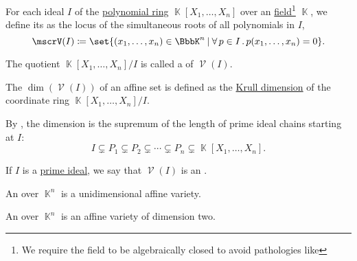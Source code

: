 \begin{definition}\label{def:affine_algebraic_set}
  For each ideal \( I \) of the \hyperref[def:polynomial_algebra]{polynomial ring} \( \BbbK[X_1, \ldots, X_n] \) over an  \hyperref[def:field]{field}\footnote{We require the field to be algebraically closed to avoid pathologies like } \( \BbbK \), we define its  as the locus of the simultaneous roots of all polynomials in \( I \),
  \begin{equation*}
    \mscrV(I) \coloneqq \set{ (x_1, \ldots, x_n) \in \BbbK^n \given \qforall {p \in I} p(x_1, \ldots, x_n) = 0 }.
  \end{equation*}

  \begin{thmenum}
     The quotient \( \BbbK[X_1, \ldots, X_n] / I \) is called a  of \( \mscrV(I) \).

     The  \( \dim(\mscrV(I)) \) of an affine set is defined as the \hyperref[def:krull_dimension]{Krull dimension} of the coordinate ring \( \BbbK[X_1, \ldots, X_n] / I \).

    By , the dimension is the supremum of the length of prime ideal chains starting at \( I \):
    \begin{equation*}
      I \subsetneq P_1 \subsetneq P_2 \subsetneq \cdots \subsetneq P_n \subsetneq \BbbK[X_1, \ldots, X_n].
    \end{equation*}

     If \( I \) is a \hyperref[def:semiring_ideal/prime]{prime ideal}, we say that \( \mscrV(I) \) is an .

     An  over \( \BbbK^n \) is a unidimensional affine variety.

     An  over \( \BbbK^n \) is an affine variety of dimension two.
  \end{thmenum}
\end{definition}

